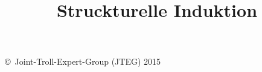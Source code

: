 \documentclass{article}
\title{Struckturelle Induktion}
\date{ }
\begin{document}
	\maketitle
	
	\begin{tiny}
	\copyright\ Joint-Troll-Expert-Group (JTEG) 2015
	\end{tiny}
\end{document}
